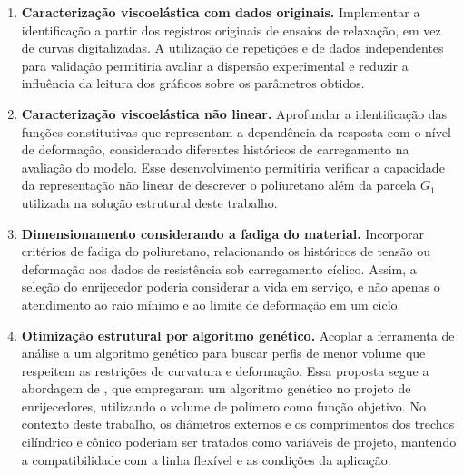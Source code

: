 \documentclass[arial,centeredequations,english,brazilian,oneside,section=TITLE]{ifes8}
\begin{document}
\begin{enumerate}
  \item \textbf{Caracterização viscoelástica com dados originais.}
  Implementar a identificação a partir dos registros originais de
  ensaios de relaxação, em vez de curvas digitalizadas. A utilização
  de repetições e de dados independentes para validação permitiria
  avaliar a dispersão experimental e reduzir a influência da leitura
  dos gráficos sobre os parâmetros obtidos.

  \item \textbf{Caracterização viscoelástica não linear.} Aprofundar a
  identificação das funções constitutivas que representam a dependência
  da resposta com o nível de deformação, considerando diferentes
  históricos de carregamento na avaliação do modelo. Esse desenvolvimento
  permitiria verificar a capacidade da representação não linear de
  descrever o poliuretano além da parcela $G_1$ utilizada na solução
  estrutural deste trabalho.

  \item \textbf{Dimensionamento considerando a fadiga do material.}
  Incorporar critérios de fadiga do poliuretano, relacionando os
  históricos de tensão ou deformação aos dados de resistência sob
  carregamento cíclico. Assim, a seleção do enrijecedor poderia considerar
  a vida em serviço, e não apenas o atendimento ao raio mínimo e ao
  limite de deformação em um ciclo.

  \item \textbf{Otimização estrutural por algoritmo genético.} Acoplar
  a ferramenta de análise a um algoritmo genético para buscar perfis
  de menor volume que respeitem as restrições de curvatura e deformação.
  Essa proposta segue a abordagem de , que
  empregaram um algoritmo genético no projeto de enrijecedores,
  utilizando o volume de polímero como função objetivo. No contexto
  deste trabalho, os diâmetros externos e os comprimentos dos trechos
  cilíndrico e cônico poderiam ser tratados como variáveis de projeto,
  mantendo a compatibilidade com a linha flexível e as condições da
  aplicação.
\end{enumerate}


\postextual



\end{document}
